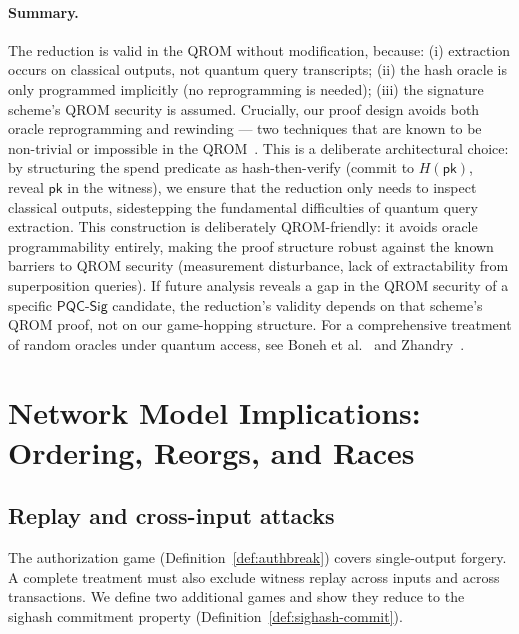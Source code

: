 \documentclass[11pt]{article}
\newcommand{\PQC}{\mathsf{PQC}}
\begin{document}
\paragraph{Summary.}
The reduction is valid in the QROM without modification, because:
(i) extraction occurs on classical outputs, not quantum query transcripts;
(ii) the hash oracle is only programmed implicitly (no reprogramming is needed);
(iii) the signature scheme's QROM security is assumed.
Crucially, our proof design avoids both oracle reprogramming and rewinding --- two techniques that are known to be non-trivial or impossible in the QROM~\cite{boneh2011random,zhandry2012how}.
This is a deliberate architectural choice: by structuring the spend predicate as hash-then-verify (commit to $H(\mathsf{pk})$, reveal $\mathsf{pk}$ in the witness), we ensure that the reduction only needs to inspect classical outputs, sidestepping the fundamental difficulties of quantum query extraction.
This construction is deliberately QROM-friendly: it avoids oracle programmability entirely, making the proof structure robust against the known barriers to QROM security (measurement disturbance, lack of extractability from superposition queries).
If future analysis reveals a gap in the QROM security of a specific $\PQC\textsf{-Sig}$ candidate, the reduction's validity depends on that scheme's QROM proof, not on our game-hopping structure.
For a comprehensive treatment of random oracles under quantum access, see Boneh et al.~\cite{boneh2011random} and Zhandry~\cite{zhandry2012how}.

\section{Network Model Implications: Ordering, Reorgs, and Races}\label{sec:network}

\subsection{Replay and cross-input attacks}\label{sec:replay}

The authorization game (Definition~\ref{def:authbreak}) covers single-output forgery.
A complete treatment must also exclude witness replay across inputs and across transactions.
We define two additional games and show they reduce to the sighash commitment property (Definition~\ref{def:sighash-commit}).
\end{document}
